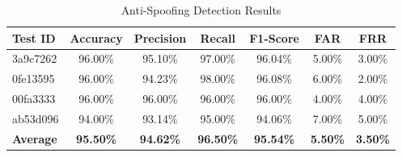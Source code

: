 \begin{table}[htbp]
\centering
\caption{Anti-Spoofing Detection Results}
\label{tab:antispoofing_results}
\begin{tabular}{|l|c|c|c|c|c|c|}
\hline
\textbf{Test ID} & \textbf{Accuracy} & \textbf{Precision} & \textbf{Recall} & \textbf{F1-Score} & \textbf{FAR} & \textbf{FRR} \\
\hline
3a9c7262 & 96.00\% & 95.10\% & 97.00\% & 96.04\% & 5.00\% & 3.00\% \\
\hline
0fe13595 & 96.00\% & 94.23\% & 98.00\% & 96.08\% & 6.00\% & 2.00\% \\
\hline
00fa3333 & 96.00\% & 96.00\% & 96.00\% & 96.00\% & 4.00\% & 4.00\% \\
\hline
ab53d096 & 94.00\% & 93.14\% & 95.00\% & 94.06\% & 7.00\% & 5.00\% \\
\hline
\hline
\textbf{Average} & \textbf{95.50\%} & \textbf{94.62\%} & \textbf{96.50\%} & \textbf{95.54\%} & \textbf{5.50\%} & \textbf{3.50\%} \\
\hline
\end{tabular}
\end{table}